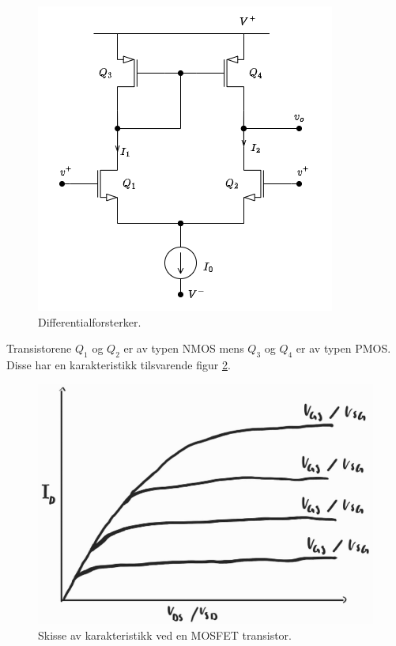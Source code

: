 \begin{figure}[!hbt]
	\centering
	\includegraphics[scale=0.5]{./Images/02Concept/differentialforsterker.png}
	\caption{Differentialforsterker.}
	\label{fig:differentialforsterker}
\end{figure}

Transistorene $Q_{1}$ og $Q_{2}$ er av typen NMOS mens $Q_{3}$ og $Q_{4}$ er av typen PMOS. Disse har en karakteristikk tilsvarende figur \ref{fig:karakteristikkting}.

\begin{figure}[!hbt]
	\centering
	\includegraphics[scale=0.2]{./Images/02Concept/karakteristikkting.jpg}
	\caption{Skisse av karakteristikk ved en MOSFET transistor.}
	\label{fig:karakteristikkting}
\end{figure}

